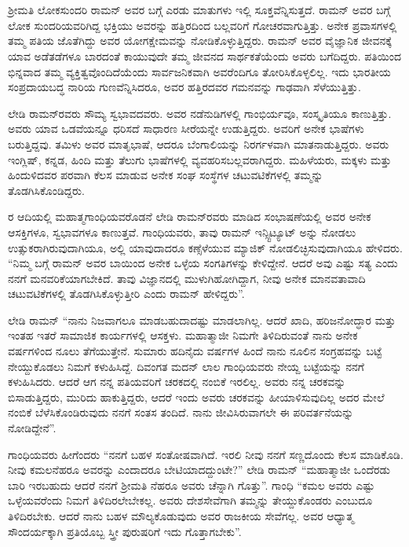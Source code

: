 
\chapter{}


ಶ‍್ರೀಮತಿ ಲೋಕಸುಂದರಿ ರಾಮನ್ ಅವರ ಬಗ್ಗೆ ಎರಡು ಮಾತುಗಳು ಇಲ್ಲಿ ಸೂಕ್ತವೆನ್ನಿಸುತ್ತದೆ. ರಾಮನ್ ಅವರ ಬಗ್ಗೆ ಲೋಕ ಸುಂದರಿಯವರಿಗಿದ್ದ ಭಕ್ತಿಯು ಅವರನ್ನು ಹತ್ತಿರದಿಂದ ಬಲ್ಲವರಿಗೆ ಗೋಚರವಾಗುತ್ತಿತ್ತು. ಅನೇಕ ಪ್ರವಾಸಗಳಲ್ಲಿ ತಮ್ಮ ಪತಿಯ ಜೊತೆಗಿದ್ದು ಅವರ ಯೋಗಕ್ಷೇಮವನ್ನು ನೋಡಿಕೊಳ್ಳುತ್ತಿದ್ದರು. ರಾಮನ್ ಅವರ ವೈಜ್ಞಾನಿಕ ಜೀವನಕ್ಕೆ ಯಾವ ಅಡೆತಡೆಗಳೂ ಬಾರದಂತೆ ಕಾಯುವುದೇ ತಮ್ಮ ಜೀವನದ ಸಾರ್ಥಕತೆಯೆಂದು ಅವರು ಬಗೆದಿದ್ದರು. ಪತಿಯಿಂದ ಭಿನ್ನವಾದ ತಮ್ಮ ವ್ಯಕ್ತಿತ್ವವೊಂದಿದೆಯೆಂದು ಸಾರ್ವಜನಿಕವಾಗಿ ಅವರೆಂದಿಗೂ ತೋರಿಸಿಕೊಳ್ಳಲಿಲ್ಲ. ಇದು ಭಾರತೀಯ ಸಂಪ್ರದಾಯಬದ್ಧ ನಾರಿಯ ಗುಣವೆನ್ನಿಸಿದರೂ, ಅವರ ಹತ್ತಿರದವರ ಗಮನವನ್ನು ಗಾಢವಾಗಿ ಸೆಳೆಯುತ್ತಿತ್ತು.

ಲೇಡಿ ರಾಮನ್‍ರವರು ಸೌಮ್ಯ ಸ್ವಭಾವದವರು. ಅವರ ನಡೆನುಡಿಗಳಲ್ಲಿ ಗಾಂಭಿರ್ಯವೂ, ಸಂಸ್ಕೃತಿಯೂ ಕಾಣುತ್ತಿತ್ತು. ಅವರು ಯಾವ ಒಡವೆಯನ್ನೂ ಧರಿಸದೆ ಸಾಧಾರಣ ಸೀರೆಯನ್ನೇ ಉಡುತ್ತಿದ್ದರು. ಅವರಿಗೆ ಅನೇಕ ಭಾಷೆಗಳು ಬರುತ್ತಿದ್ದವು. ತಮಿಳು ಅವರ ಮಾತೃಭಾಷೆ, ಆದರೂ ಬೆಂಗಾಲಿಯನ್ನು ನಿರರ್ಗಳವಾಗಿ ಮಾತನಾಡುತ್ತಿದ್ದರು. ಅವರು ಇಂಗ್ಲಿಷ್, ಕನ್ನಡ, ಹಿಂದಿ ಮತ್ತು ತೆಲುಗು ಭಾಷೆಗಳಲ್ಲಿ ವ್ಯವಹರಿಸಬಲ್ಲವರಾಗಿದ್ದರು. ಮಹಿಳೆಯರು, ಮಕ್ಕಳು ಮತ್ತು ಹಿಂದುಳಿದವರ ಪರವಾಗಿ ಕೆಲಸ ಮಾಡುವ ಅನೇಕ ಸಂಘ ಸಂಸ್ಥೆಗಳ ಚಟುವಟಿಕೆಗಳಲ್ಲಿ ತಮ್ಮನ್ನು ತೊಡಗಿಸಿಕೊಂಡಿದ್ದರು.

ರ ಆದಿಯಲ್ಲಿ ಮಹಾತ್ಮಗಾಂಧಿಯವರೊಡನೆ ಲೇಡಿ ರಾಮನ್‍ರವರು ಮಾಡಿದ ಸಂಭಾಷಣೆಯಲ್ಲಿ ಅವರ ಅನೇಕ ಆಸಕ್ತಿಗಳೂ, ಸ್ವಭಾವಗಳೂ ಕಾಣುತ್ತವೆ. ಗಾಂಧಿಯವರು, ತಾವು ರಾಮನ್ ಇನ್ಸ್ಟಿಟ್ಯೂಟ್ ಅನ್ನು ನೋಡಲು ಉತ್ಸುಕರಾಗಿರುವುದಾಗಿಯೂ, ಅಲ್ಲಿ ಯಾವುದಾದರೂ ಕಣ್ಸೆಳೆಯುವ ಮ್ಯಾಜಿಕ್ ನೋಡಲಿಚ್ಛಿಸುವುದಾಗಿಯೂ ಹೇಳಿದರು. “ನಿಮ್ಮ ಬಗ್ಗೆ ರಾಮನ್ ಅವರ ಬಾಯಿಂದ ಅನೇಕ ಒಳ್ಳೆಯ ಸಂಗತಿಗಳನ್ನು ಕೇಳಿದ್ದೇನೆ. ಆದರೆ ಅವು ಎಷ್ಟು ಸತ್ಯ ಎಂದು ನನಗೆ ಮನವರಿಕೆಯಾಗಬೇಕಿದೆ. ತಾವು ವಿಜ್ಞಾನದಲ್ಲಿ ಮುಳುಗಿಹೋಗಿದ್ದಾಗ, ನೀವು ಅನೇಕ ಮಾನವತಾವಾದಿ ಚಟುವಟಿಕೆಗಳಲ್ಲಿ ತೊಡಗಿಸಿಕೊಳ್ಳುತ್ತೀರಿ ಎಂದು ರಾಮನ್ ಹೇಳಿದ್ದರು”.

ಲೇಡಿ ರಾಮನ್ \enginline{-} “ನಾನು ನಿಜವಾಗಲೂ ಮಾಡಬಹುದಾದಷ್ಟು ಮಾಡಲಾಗಿಲ್ಲ. ಆದರೆ ಖಾದಿ, ಹರಿಜನೋದ್ಧಾರ ಮತ್ತು ಇಂತಹ ಇತರೆ ಸಾಮಾಜಿಕ ಕಾರ್ಯಗಳಲ್ಲಿ ಆಸಕ್ತಳು. ಮಹಾತ್ಮಾಜೀ ನಿಮಗೇ ತಿಳಿದಿರುವಂತೆ ನಾನು ಅನೇಕ ವರ್ಷಗಳಿಂದ ನೂಲು ತೆಗೆಯುತ್ತೇನೆ. ಸುಮಾರು ಹದಿನೈದು ವರ್ಷಗಳ ಹಿಂದೆ ನಾನು ನೂಲಿನ ಸಂಗ್ರಹವನ್ನು ಬಟ್ಟೆ ನೇಯ್ದುಕೊಡಲು ನಿಮಗೆ ಕಳುಹಿಸಿದ್ದೆ. ದಿವಂಗತ ಮದನ್ ಲಾಲ ಗಾಂಧಿಯವರು ನೇಯ್ದ ಬಟ್ಟೆಯನ್ನು ನನಗೆ ಕಳುಹಿಸಿದರು. ಆದರೆ ಆಗ ನನ್ನ ಪತಿಯವರಿಗೆ ಚರಕದಲ್ಲಿ ನಂಬಿಕೆ ಇರಲಿಲ್ಲ. ಅವರು ನನ್ನ ಚರಕವನ್ನು ಬಿಸಾಡುತ್ತಿದ್ದರು, ಮುರಿದು ಹಾಕುತ್ತಿದ್ದರು, ಆದರೆ ಇಂದು ಅವರು ಚರಕವನ್ನು ಹೀಯಾಳಿಸುವುದಿಲ್ಲ ಅದರ ಮೇಲೆ ನಂಬಿಕೆ ಬೆಳೆಸಿಕೊಂಡಿರುವುದು ನನಗೆ ಸಂತಸ ತಂದಿದೆ. ನಾನು ಜೀವಿಸಿರುವಾಗಲೇ ಈ ಪರಿವರ್ತನೆಯನ್ನು ನೋಡಿದ್ದೇನೆ”.

ಗಾಂಧಿಯವರು ಹೀಗೆಂದರು “ನನಗೆ ಬಹಳ ಸಂತೋಷವಾಗಿದೆ. ಇರಲಿ ನೀವು ನನಗೆ ಸಣ್ಣದೊಂದು ಕೆಲಸ ಮಾಡಿಕೊಡಿ. ನೀವು ಕಮಲನೆಹರೂ ಅವರನ್ನು ಎಂದಾದರೂ ಬೇಟಿಯಾದದ್ದುಂಟೇ?” ಲೇಡಿ ರಾಮನ್\enginline{-} “ಮಹಾತ್ಮಾಜೀ ಒಂದೆರಡು ಬಾರಿ ಇರಬಹುದು ಆದರೆ ನನಗೆ ಶ‍್ರೀಮತಿ ನೆಹರೂ ಅವರು ಚೆನ್ನಾಗಿ ಗೊತ್ತು”. ಗಾಂಧಿ \enginline{-} “ಕಮಲ ಅವರು ಎಷ್ಟು ಒಳ್ಳೆಯವರೆಂದು ನಿಮಗೆ ತಿಳಿದಿರಲೇಬೇಕಲ್ಲ. ಅವರು ದೇಶಸೇವೆಗಾಗಿ ತಮ್ಮನ್ನು ತೇಯ್ದುಕೊಂಡರು ಎಂಬುದೂ ತಿಳಿದಿರಬೇಕು. ಆದರೆ ನಾನು ಬಹಳ ಮೌಲ್ಯಕೊಡುವುದು ಅವರ ರಾಜಕೀಯ ಸೇವೆಗಲ್ಲ. ಅವರ ಆಧ್ಯಾತ್ಮ ಸೌಂದರ್ಯಕ್ಕಾಗಿ ಪ್ರತಿಯೊಬ್ಬ ಸ್ತ್ರೀ ಪುರುಷರಿಗೆ ಇದು ಗೊತ್ತಾಗಬೇಕು”.

